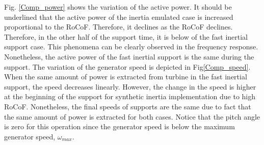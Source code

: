 Fig. \ref{Comp_power} shows the variation of the active power. It should be underlined that the active power of the inertia emulated case is increased proportional to the RoCoF. Therefore, it declines as the RoCoF declines. Therefore, in the other half of the support time, it is below of the fast inertial support case. This phenomena can be clearly observed in the frequency response. Nonetheless, the active power of the fast inertial support is the same during the support. The variation of the generator speed is depicted in Fig\ref{Comp_speed}. When the same amount of power is extracted from turbine in the fast inertial support, the speed decreases linearly. However, the change in the speed is higher at the beginning of the support for synthetic inertia implementation due to high RoCoF. Nonetheless, the final speeds of supports are the same due to fact that the same amount of power is extracted for both cases. Notice that the pitch angle is zero for this operation since the generator speed is below the maximum generator speed, $\omega_{max}$.\par 

